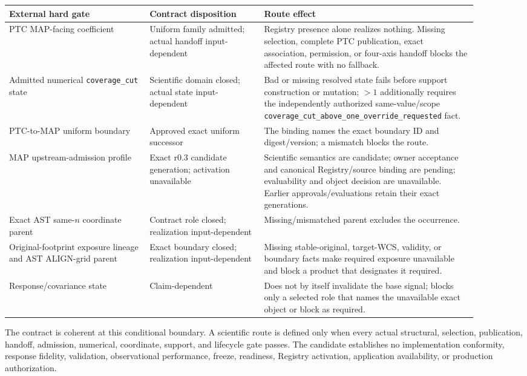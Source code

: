 \documentclass[10pt]{article}
\newcommand{\code}[1]{\nolinkurl{#1}}
\begin{document}
\begin{longtable}{L{0.27\linewidth}L{0.22\linewidth}L{0.41\linewidth}}
\toprule
External hard gate & Contract disposition & Route effect\\
\midrule
PTC MAP-facing coefficient & Uniform family admitted; actual handoff input-dependent & Registry presence alone realizes nothing. Missing selection, complete PTC publication, exact association, permission, or four-axis handoff blocks the affected route with no fallback.\\
Admitted numerical \code{coverage\_cut} state & Scientific domain closed; actual state input-dependent & Bad or missing resolved state fails before support construction or mutation; \(>1\) additionally requires the independently authorized same-value/scope \code{coverage_cut_above_one_override_requested} fact.\\
PTC-to-MAP uniform boundary & Approved exact uniform successor & The binding names the exact boundary ID and digest/version; a mismatch blocks the route.\\
MAP upstream-admission profile & Exact r0.3 candidate generation; activation unavailable & Scientific semantics are candidate; owner acceptance and canonical Registry/source binding are pending; evaluability and object decision are unavailable. Earlier approvals/evaluations retain their exact generations.\\
Exact AST same-\(n\) coordinate parent & Contract role closed; realization input-dependent & Missing/mismatched parent excludes the occurrence.\\
Original-footprint exposure lineage and AST ALIGN-grid parent & Exact boundary closed; realization input-dependent & Missing stable-original, target-WCS, validity, or boundary facts make required exposure unavailable and block a product that designates it required.\\
Response/covariance state & Claim-dependent & Does not by itself invalidate the base signal; blocks only a selected role that names the unavailable exact object or block as required.\\
\bottomrule
\end{longtable}

The contract is coherent at this conditional boundary. A scientific route is
defined only when every actual structural, selection, publication, handoff,
admission, numerical, coordinate, support, and lifecycle gate passes. The
candidate establishes no implementation conformity, response fidelity,
validation, observational performance, freeze, readiness, Registry activation,
application availability, or production authorization.
\end{document}
